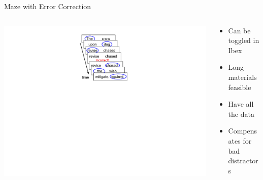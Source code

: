 \documentclass[12pt, xcolor=beamer,table,usenames,dvipsnames, ignorenonframetext, ngerman,t]{beamer}
\begin{document}
\begin{frame}{Maze with Error Correction}

\begin{columns}
	\begin{column}{0.4\textwidth}
		\begin{center}
		\includegraphics[clip, trim=9cm 12.5cm 10cm 1cm,width=\textwidth]{../maze_diagram.pdf}
		\end{center}
		
	\end{column} \pause 
	\begin{column}{0.6\textwidth} 
		\begin{center}
			\begin{itemize}
				\item Can be toggled in Ibex \pause
				\item Long materials feasible \pause
				\item Have all the data \pause
				\item Compensates for bad distractors
			\end{itemize}
		\end{center}
	\end{column}
\end{columns}
\medskip
\pause
\end{frame}
%
\end{document}

